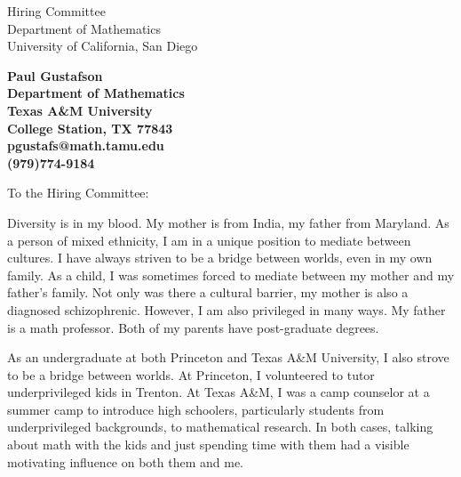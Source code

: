 \documentclass[11pt]{letter} %
\begin{document}

\begin{letter}{Hiring Committee \\
Department of Mathematics \\
University of California, San Diego}


\begin{center}
\large\bf Paul Gustafson \\ %
Department of Mathematics \\ Texas A\&M University \\ College Station, TX 77843 \\ pgustafs@math.tamu.edu \\ (979)774-9184 %
\end{center} 

\vfill 


\opening{To the Hiring Committee:}

Diversity is in my blood.  My mother is from India, my father from Maryland. As a person of mixed ethnicity, I am in a unique position to mediate between cultures. I have always striven to be a bridge between worlds, even in my own family. 
As a child, I was sometimes forced to mediate between my mother and my father's family.  Not only was there a cultural barrier, my mother is also a diagnosed schizophrenic.  However, I am also privileged in many ways.  My father is a math professor.  Both of my parents have post-graduate degrees.

As an undergraduate at both Princeton and Texas A\&M University, I also strove to be a bridge between worlds.  At Princeton, I volunteered to tutor underprivileged kids in Trenton.  At Texas A\&M, I was a camp counselor at a summer camp to introduce high schoolers, particularly students from underprivileged backgrounds, to mathematical research.  In both cases, talking about math with the kids and just spending time with them had a visible motivating influence on both them and me.


\end{letter}
\end{document}
